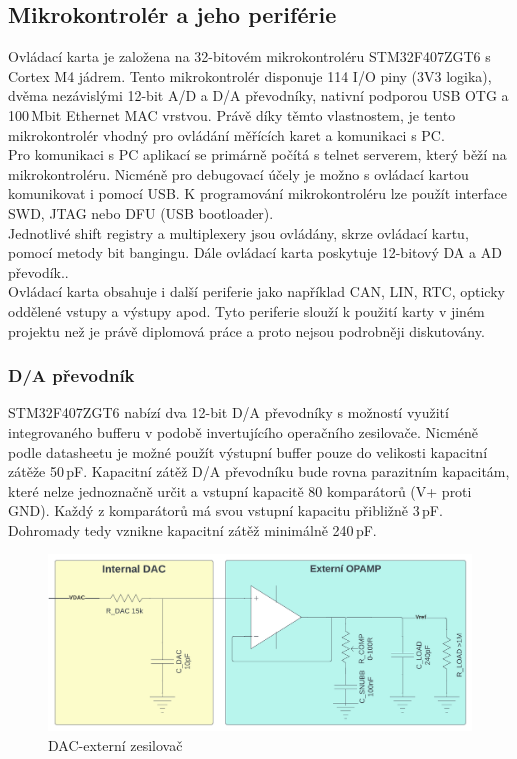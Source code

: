     \subsection{Mikrokontrolér a jeho periférie}
    Ovládací karta je založena na 32-bitovém mikrokontroléru STM32F407ZGT6 s Cortex M4 jádrem.
    Tento mikrokontrolér disponuje 114 I/O piny (3V3 logika), dvěma nezávislými 12-bit A/D a D/A převodníky,
    nativní podporou USB OTG a 100\,Mbit Ethernet MAC vrstvou. Právě díky těmto vlastnostem, je tento
    mikrokontrolér vhodný pro ovládání měřících karet a komunikaci s PC.\\

    Pro komunikaci s PC aplikací se primárně počítá s telnet serverem,
    který běží na mikrokontroléru. Nicméně pro debugovací
    účely je možno s ovládací kartou komunikovat i pomocí USB.
    K programování mikrokontroléru lze použít interface SWD, JTAG nebo DFU (USB bootloader).\\

    Jednotlivé shift registry a multiplexery jsou ovládány, skrze ovládací kartu, pomocí metody bit bangingu.
    Dále ovládací karta poskytuje 12-bitový DA a AD převodík.\cite{MARTINT}.\\

    Ovládací karta obsahuje i další periferie jako například CAN, LIN, RTC, opticky oddělené vstupy a výstupy apod.
    Tyto periferie slouží k použití karty v jiném projektu než je právě diplomová práce a proto nejsou podrobněji diskutovány.


    \subsubsection{D/A převodník}
    STM32F407ZGT6 nabízí dva 12-bit D/A převodníky s možností využití integrovaného bufferu v podobě
    invertujícího operačního zesilovače. Nicméně podle datasheetu
    je možné použít výstupní buffer pouze do velikosti kapacitní zátěže 50\,pF.
    Kapacitní zátěž D/A převodníku bude rovna parazitním kapacitám, které nelze jednoznačně určit
    a vstupní kapacitě 80 komparátorů (V+ proti GND). Každý z komparátorů má svou vstupní kapacitu
    přibližně 3\,pF. Dohromady tedy vznikne kapacitní zátěž minimálně 240\,pF.\cite{DAC}\\
    \begin{figure}[ht!]
        \centering
        \includegraphics[width = 1\textwidth]{obrazky/DAC_OPAMP.png}
        \caption{DAC-externí zesilovač}
        \label{fig: DAC-externí zesilovač}
        
    \end{figure}

